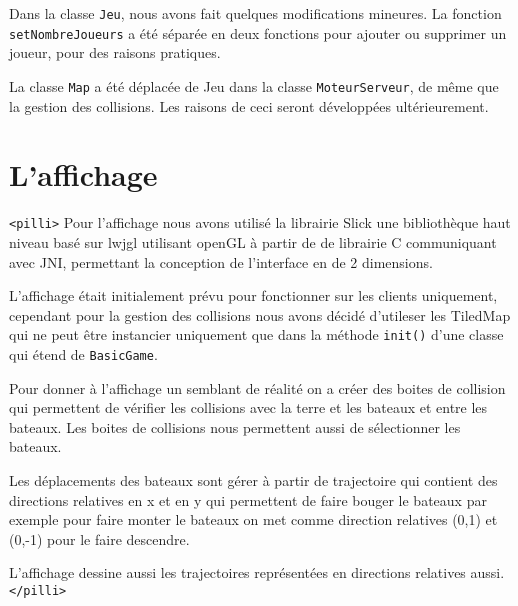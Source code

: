 Dans la classe \verb+Jeu+, nous avons fait quelques modifications mineures. La fonction \verb+setNombreJoueurs+ a été séparée en deux fonctions pour ajouter ou supprimer un joueur, pour des raisons pratiques. 

La classe \verb+Map+ a été déplacée de Jeu dans la classe \verb+MoteurServeur+, de même que la gestion des collisions. Les raisons de ceci seront développées ultérieurement.

\section{L'affichage}
\verb+<pilli>+
Pour l'affichage nous avons utilisé la librairie Slick une bibliothèque haut niveau basé sur lwjgl utilisant openGL à partir de de librairie C communiquant avec JNI, permettant la conception de l'interface en de 2 dimensions. 

L'affichage était initialement prévu pour fonctionner sur les clients uniquement, cependant pour la gestion des collisions nous avons décidé d'utileser les TiledMap qui ne peut être instancier uniquement que dans la méthode \verb+init()+ d'une classe qui étend de \verb+BasicGame+.

Pour donner à l'affichage un semblant de réalité on a créer des boites de collision qui permettent de vérifier les collisions avec la terre et les bateaux et entre les bateaux. Les boites de collisions nous permettent aussi de sélectionner les bateaux. 

Les déplacements des bateaux sont gérer à partir de trajectoire qui contient des directions relatives en x et en y qui permettent de faire bouger le bateaux par exemple pour faire monter le bateaux on met comme direction relatives (0,1) et (0,-1) pour le faire descendre.

L'affichage dessine aussi les trajectoires représentées en directions relatives aussi. 
\verb+</pilli>+


